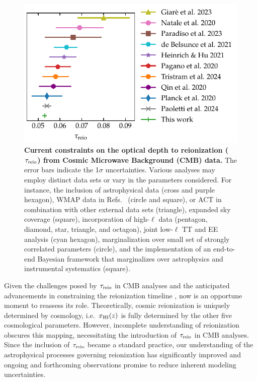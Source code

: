 \begin{figure}[tb]
\centering
\includegraphics{figs/tau_fig.pdf}
\caption{\textbf{Current constraints on the optical depth to
reionization ($\tau_{\mathrm{reio}}$) from Cosmic Microwave Background (CMB)
data.}
The error bars indicate the 1$\sigma$ uncertainties.
Various analyses may employ distinct data sets or vary in the parameters
considered.
For instance, the inclusion of astrophysical data \cite{Qin2020,Paoletti2024} 
(cross and purple hexagon), WMAP data in Refs.~ \cite{Natale2020,
Paradiso2023} (circle and square), or ACT in combination with other
external data sets \cite{Giare2023} (triangle), expanded sky coverage
\cite{Paradiso2023} (square), incorporation of high-$\ell$ data
\cite{Pagano2020, Planck2020a, HeinrichHu2021, Giare2023, Tristram2024} 
(pentagon, diamond, star, triangle, and octagon), joint low-$\ell$ TT and EE 
analysis \cite{deBelsunce2021} (cyan hexagon), marginalization over 
small set of strongly correlated parameters \cite{Natale2020} (circle), 
and the implementation of an end-to-end Bayesian framework that marginalizes 
over astrophysics and instrumental systematics \cite{Paradiso2023} (square).}
\label{fig:tau}
\end{figure}

Given the challenges posed by $\tau_{\mathrm{reio}}$ in CMB analyses and the
anticipated advancements in constraining the reionization timeline
\cite{Montero2021, Hera2022}, now is an opportune moment to reassess its
role.
Theoretically, cosmic reionization is uniquely determined by
cosmology, i.e.\  $x_{\mathrm{HI}}(z)$ is fully determined by the other five cosmological
parameters. However, incomplete understanding of
reionization obscures this mapping, necessitating the introduction
of $\tau_{\mathrm{reio}}$ in CMB analyses. Since the inclusion of 
$\tau_{\mathrm{reio}}$ became a standard practice, 
our understanding of the astrophysical 
processes governing reionization has significantly 
improved\cite{Gnedin2022, Kannan2022,Murray2020, Fan2023}  
and ongoing and forthcoming observations promise to reduce inherent
modeling uncertainties.


